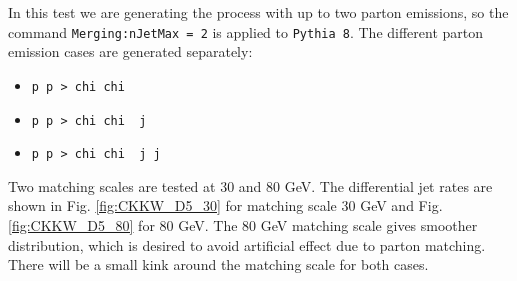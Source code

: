 In this test we are generating the process with up to two parton emissions, so the command \texttt{Merging:nJetMax = 2} is applied to \texttt{Pythia 8}. The different parton emission cases are generated separately:
\begin{itemize}
\item \texttt{p p > chi chi~}
\item \texttt{p p > chi chi~ j}
\item \texttt{p p > chi chi~ j j}
\end{itemize}
Two matching scales are tested at 30 and 80 GeV. The differential jet rates are shown in Fig. \ref{fig:CKKW_D5_30} for matching scale 30 GeV and Fig. \ref{fig:CKKW_D5_80} for 80 GeV. The 80 GeV matching scale gives smoother distribution, which is desired to avoid artificial effect due to parton matching. There will be a small kink around the matching scale for both cases.


